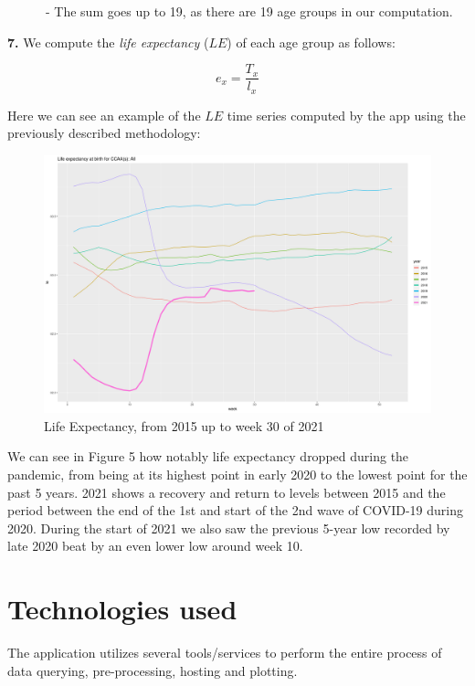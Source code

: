\documentclass[
  a4paper]{article}
\begin{document}
~~~~~~- The sum goes up to 19, as there are 19 age groups in our
computation.

\textbf{7.} We compute the \emph{life expectancy} (\(LE\)) of each age
group as follows:

\begin{equation}
\tag{7}
e_{x} = \frac{T_x}{l_x}
\end{equation}

Here we can see an example of the \(LE\) time series computed by the app
using the previously described methodology:

\begin{figure}
\centering
\includegraphics{./images/le.png}
\caption{Life Expectancy, from 2015 up to week 30 of 2021}
\end{figure}

We can see in Figure 5 how notably life expectancy dropped during the
pandemic, from being at its highest point in early 2020 to the lowest
point for the past 5 years. 2021 shows a recovery and return to levels
between 2015 and the period between the end of the 1st and start of the
2nd wave of COVID-19 during 2020. During the start of 2021 we also saw
the previous 5-year low recorded by late 2020 beat by an even lower low
around week 10.

\newpage

\hypertarget{technologies-used}{%
\section{Technologies used}\label{technologies-used}}

The application utilizes several tools/services to perform the entire
process of data querying, pre-processing, hosting and plotting.
\end{document}
